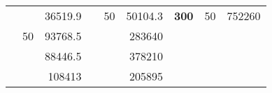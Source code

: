 \begin{table}[]
\begin{tabular}{|ccrccrccc}
\rowcolor[HTML]{DDFDFF} 
\multicolumn{1}{|c|}{\cellcolor[HTML]{FFFFC7}}                                & \multicolumn{1}{c|}{\cellcolor[HTML]{DDFDFF}}                      & \multicolumn{1}{r|}{\cellcolor[HTML]{DAE8FC}36519.9}   & \multicolumn{1}{c|}{\cellcolor[HTML]{FFFFC7}}                                & \multicolumn{1}{c|}{\multirow{-10}{*}{\cellcolor[HTML]{DDFDFF}50}}  & \multicolumn{1}{r|}{\cellcolor[HTML]{DDFDFF}50104.3}   & \multicolumn{1}{c|}{\multirow{-19}{*}{\cellcolor[HTML]{FFFFC7}\textbf{300}}} & \multicolumn{1}{c|}{\multirow{-10}{*}{\cellcolor[HTML]{DDFDFF}50}} & \multicolumn{1}{r|}{\cellcolor[HTML]{DDFDFF}752260}    \\ \cline{3-3} \cline{5-9} 
\multicolumn{1}{|c|}{\cellcolor[HTML]{FFFFC7}}                                & \multicolumn{1}{c|}{\multirow{-10}{*}{\cellcolor[HTML]{DDFDFF}50}} & \multicolumn{1}{r|}{\cellcolor[HTML]{DDFDFF}93768.5}   & \multicolumn{1}{c|}{\cellcolor[HTML]{FFFFC7}}                                & \multicolumn{1}{c|}{\cellcolor[HTML]{DAE8FC}}                       & \multicolumn{1}{r|}{\cellcolor[HTML]{DAE8FC}283640}    &                                                                              &                                                                    &                                                        \\ \cline{2-3} \cline{6-6}
\multicolumn{1}{|c|}{\cellcolor[HTML]{FFFFC7}}                                & \multicolumn{1}{c|}{\cellcolor[HTML]{DAE8FC}}                      & \multicolumn{1}{r|}{\cellcolor[HTML]{DAE8FC}88446.5}   & \multicolumn{1}{c|}{\cellcolor[HTML]{FFFFC7}}                                & \multicolumn{1}{c|}{\cellcolor[HTML]{DAE8FC}}                       & \multicolumn{1}{r|}{\cellcolor[HTML]{DDFDFF}378210}    &                                                                              &                                                                    &                                                        \\ \cline{3-3} \cline{6-6}
\multicolumn{1}{|c|}{\cellcolor[HTML]{FFFFC7}}                                & \multicolumn{1}{c|}{\cellcolor[HTML]{DAE8FC}}                      & \multicolumn{1}{r|}{\cellcolor[HTML]{DDFDFF}108413}    & \multicolumn{1}{c|}{\cellcolor[HTML]{FFFFC7}}                                & \multicolumn{1}{c|}{\cellcolor[HTML]{DAE8FC}}                       & \multicolumn{1}{r|}{\cellcolor[HTML]{DAE8FC}205895}    &                                                                              &                                                                    &                                                        \\ \cline{3-3} \cline{6-6}

\end{tabular}
\end{table}
